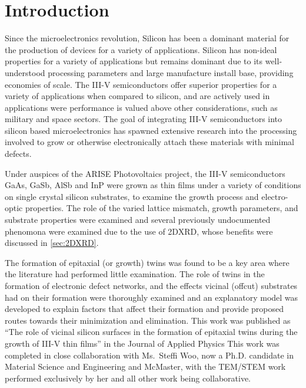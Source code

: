 \section{Introduction}
Since the microelectronics revolution, Silicon has been a dominant material for the production of devices for a variety of applications.
Silicon has non-ideal properties for a variety of applications but remains dominant due to its well-understood processing parameters and large manufacture install base, providing economies of scale.
The III-V semiconductors offer superior properties for a variety of applications when compared to silicon, and are actively used in applications were performance is valued above other considerations, such as military and space sectors.
The goal of integrating III-V semiconductors into silicon based microelectronics has spawned extensive research into the processing involved to grow or otherwise electronically attach these materials with minimal defects.

Under auspices of the ARISE Photovoltaics project, the III-V semiconductors GaAs, GaSb, AlSb and InP were grown as thin films under a variety of conditions on single crystal silicon substrates, to examine the growth process and electro-optic properties.
The role of the varied lattice mismatch, growth parameters, and substrate properties were examined and several previously undocumented phenomona were examined due to the use of 2DXRD, whose benefits were discussed in \cref{sec:2DXRD}.

The formation of epitaxial (or growth) twins was found to be a key area where the literature had performed little examination.
The role of twins in the formation of electronic defect networks, and the effects vicinal (offcut) substrates had on their formation were thoroughly examined and an explanatory model was developed to explain factors that affect their formation and provide proposed routes towards their minimization and elimination.
This work was published as ``The role of vicinal silicon surfaces in the formation of epitaxial
twins during the growth of III-V thin films'' in the Journal of Applied Physics\cite{Devenyi2011}
This work was completed in close collaboration with Ms.~Steffi Woo, now a Ph.D. candidate in Material Science and Engineering and McMaster, with the TEM/STEM work performed exclusively by her and all other work being collaborative.
